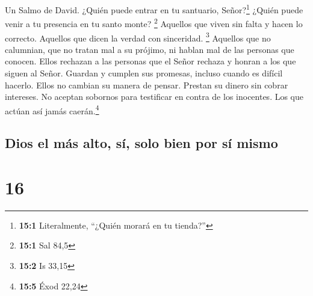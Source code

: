 Un Salmo de David.  ¿Quién puede entrar en tu santuario,
Señor?\footnote{\textbf{15:1} Literalmente, ``¿Quién morará en tu
  tienda?''} ¿Quién puede venir a tu presencia en tu santo monte?
\footnote{\textbf{15:1} Sal 84,5}  Aquellos que viven sin
falta y hacen lo correcto. Aquellos que dicen la verdad con sinceridad.
\footnote{\textbf{15:2} Is 33,15}  Aquellos que no
calumnian, que no tratan mal a su prójimo, ni hablan mal de las personas
que conocen.  Ellos rechazan a las personas que el Señor
rechaza y honran a los que siguen al Señor. Guardan y cumplen sus
promesas, incluso cuando es difícil hacerlo. Ellos no cambian su manera
de pensar.  Prestan su dinero sin cobrar intereses. No
aceptan sobornos para testificar en contra de los inocentes. Los que
actúan así jamás caerán.\footnote{\textbf{15:5} Éxod 22,24}

\hypertarget{dios-el-muxe1s-alto-suxed-solo-bien-por-suxed-mismo}{%
\subsection{Dios el más alto, sí, solo bien por sí
mismo}\label{dios-el-muxe1s-alto-suxed-solo-bien-por-suxed-mismo}}

\hypertarget{section-15}{%
\section{16}\label{section-15}}

